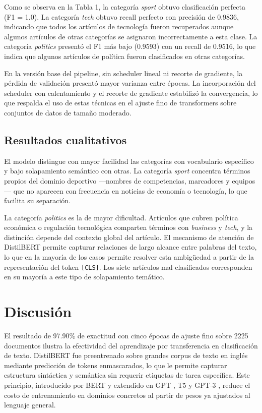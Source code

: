 \documentclass[letterpaper, 10 pt, conference]{latex_template/ieeeconf}
\begin{document}
Como se observa en la Tabla 1, la categoría \textit{sport} obtuvo clasificación perfecta (F1 = 1.0). La categoría \textit{tech} obtuvo recall perfecto con precisión de 0.9836, indicando que todos los artículos de tecnología fueron recuperados aunque algunos artículos de otras categorías se asignaron incorrectamente a esta clase. La categoría \textit{politics} presentó el F1 más bajo (0.9593) con un recall de 0.9516, lo que indica que algunos artículos de política fueron clasificados en otras categorías.

En la versión base del pipeline, sin scheduler lineal ni recorte de gradiente, la pérdida de validación presentó mayor varianza entre épocas. La incorporación del scheduler con calentamiento y el recorte de gradiente estabilizó la convergencia, lo que respalda el uso de estas técnicas en el ajuste fino de transformers sobre conjuntos de datos de tamaño moderado.

\subsection{Resultados cualitativos}

El modelo distingue con mayor facilidad las categorías con vocabulario específico y bajo solapamiento semántico con otras. La categoría \textit{sport} concentra términos propios del dominio deportivo —nombres de competencias, marcadores y equipos— que no aparecen con frecuencia en noticias de economía o tecnología, lo que facilita su separación.

La categoría \textit{politics} es la de mayor dificultad. Artículos que cubren política económica o regulación tecnológica comparten términos con \textit{business} y \textit{tech}, y la distinción depende del contexto global del artículo. El mecanismo de atención de DistilBERT permite capturar relaciones de largo alcance entre palabras del texto, lo que en la mayoría de los casos permite resolver esta ambigüedad a partir de la representación del token \texttt{[CLS]}. Los siete artículos mal clasificados corresponden en su mayoría a este tipo de solapamiento temático.

\section{Discusión}

El resultado de 97.90\% de exactitud con cinco épocas de ajuste fino sobre 2225 documentos ilustra la efectividad del aprendizaje por transferencia en clasificación de texto. DistilBERT \cite{c3} fue preentrenado sobre grandes corpus de texto en inglés mediante predicción de tokens enmascarados, lo que le permite capturar estructura sintáctica y semántica sin requerir etiquetas de tarea específica. Este principio, introducido por BERT \cite{c2} y extendido en GPT \cite{c5}, T5 \cite{c6} y GPT-3 \cite{c7}, reduce el costo de entrenamiento en dominios concretos al partir de pesos ya ajustados al lenguaje general.
\end{document}
